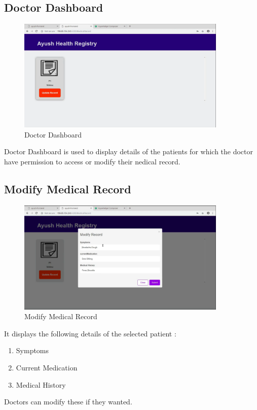 \documentclass[11pt]{report}
\begin{document}
     \subsection{Doctor Dashboard} 
    \begin{figure}[h!]
        \centering
        \includegraphics[scale=0.3,width=10cm]{Proto4.png}
        \caption{Doctor Dashboard}
        \label{fig:my_label}
    \end{figure}
    
    Doctor Dashboard is used to display details of the patients for which the doctor have permission to access or modify their nedical record.
    
     \subsection{Modify Medical Record} 
    \begin{figure}[h!]
        \centering
        \includegraphics[scale=0.3,width=10cm]{Proto5.png}
        \caption{Modify Medical Record}
        \label{fig:my_label}
    \end{figure}
    It displays the following details of the selected patient :
    \begin{enumerate}
         \item Symptoms
         \item Current Medication
         \item Medical History
        
    \end{enumerate}
   Doctors can modify these if they wanted.
    
\end{document}
